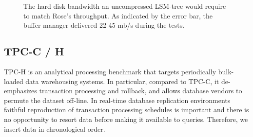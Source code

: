 \documentclass{vldb}
\newcommand{\rows}{Rose\xspace}
\newcommand{\rowss}{Rose's\xspace}
\begin{document}




\begin{figure}
\centering
{}
\caption{The hard disk bandwidth an uncompressed LSM-tree would
  require to match \rowss throughput.  As indicated by the error bar, the
  buffer manager delivered 22-45 mb/s during the tests.}
\label{fig:4R}
\end{figure}

\subsection{TPC-C / H}

TPC-H is an analytical processing benchmark that targets periodically
bulk-loaded data warehousing systems.  In particular, compared to
TPC-C, it de-emphasizes transaction processing and rollback, and
allows database vendors to permute the dataset off-line.  In real-time
database replication environments faithful reproduction of
transaction processing schedules is important and there is no
opportunity to resort data before making it available to queries.
Therefore, we insert data in chronological order.
\end{document}

